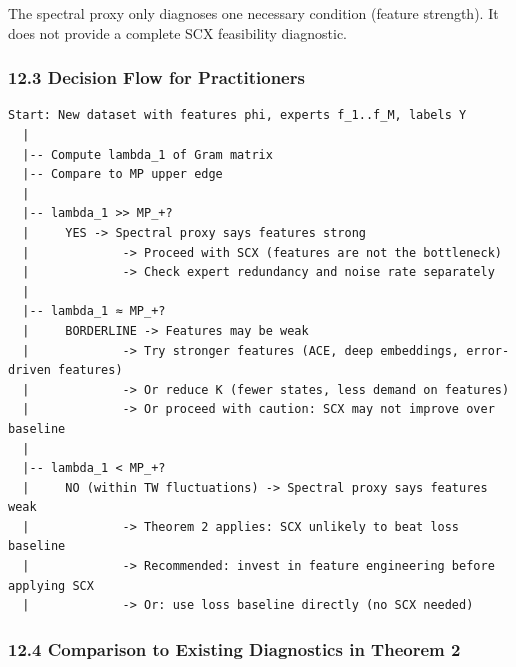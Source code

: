 \documentclass[
  12pt,
]{article}
\begin{document}
The spectral proxy only diagnoses one necessary condition (feature
strength). It does not provide a complete SCX feasibility diagnostic.

\subsubsection{12.3 Decision Flow for
Practitioners}\label{decision-flow-for-practitioners}

\begin{verbatim}
Start: New dataset with features phi, experts f_1..f_M, labels Y
  |
  |-- Compute lambda_1 of Gram matrix
  |-- Compare to MP upper edge
  |
  |-- lambda_1 >> MP_+?
  |     YES -> Spectral proxy says features strong
  |             -> Proceed with SCX (features are not the bottleneck)
  |             -> Check expert redundancy and noise rate separately
  |
  |-- lambda_1 ≈ MP_+?
  |     BORDERLINE -> Features may be weak
  |             -> Try stronger features (ACE, deep embeddings, error-driven features)
  |             -> Or reduce K (fewer states, less demand on features)
  |             -> Or proceed with caution: SCX may not improve over baseline
  |
  |-- lambda_1 < MP_+?
  |     NO (within TW fluctuations) -> Spectral proxy says features weak
  |             -> Theorem 2 applies: SCX unlikely to beat loss baseline
  |             -> Recommended: invest in feature engineering before applying SCX
  |             -> Or: use loss baseline directly (no SCX needed)
\end{verbatim}

\subsubsection{12.4 Comparison to Existing Diagnostics in Theorem
2}\label{comparison-to-existing-diagnostics-in-theorem-2}
\end{document}
